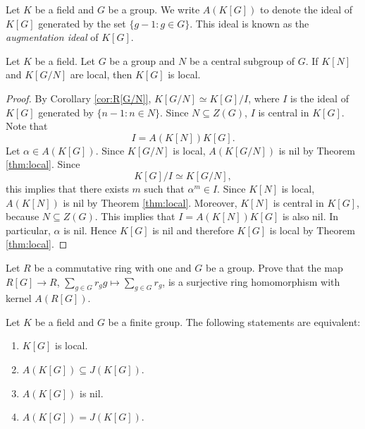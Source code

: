 Let $K$ be a field and $G$ be a group. We write $A(K[G])$ to denote
the ideal of $K[G]$ generated by the set $\{g-1:g\in G\}$. This ideal is known as the
\emph{augmentation ideal} of $K[G]$. 

\begin{corollary}
\label{cor:local_K[N]_and_K[G/N]}
    Let $K$ be a field. 
    Let $G$ be a group and $N$ be a central subgroup of $G$. If $K[N]$ and $K[G/N]$ are local, 
    then $K[G]$ is local. 
\end{corollary}

\begin{proof}
    By Corollary \ref{cor:R[G/N]}, $K[G/N]\simeq K[G]/I$, where 
    $I$ is the ideal of $K[G]$ generated by $\{n-1:n\in N\}$. Since $N\subseteq Z(G)$, 
    $I$ is central in $K[G]$. Note that 
    \[
    I=A(K[N])K[G].
    \]
    Let $\alpha\in A(K[G])$. 
    Since $K[G/N]$ is local, $A(K[G/N])$ is nil by Theorem \ref{thm:local}. Since 
    \[
    K[G]/I\simeq K[G/N],
    \]
    this implies that 
    there exists $m$ such that $\alpha^m\in I$. Since $K[N]$ is local,  
    $A(K[N])$ is nil by Theorem \ref{thm:local}. Moreover, $K[N]$ is central in $K[G]$, because $N\subseteq Z(G)$. This implies that $I=A(K[N])K[G]$ is also nil. In particular, 
    $\alpha$ is nil. Hence 
    $K[G]$ is nil and therefore $K[G]$ is local by Theorem \ref{thm:local}. 
\end{proof}


\begin{exercise}
\label{xca:augmentation}
    Let $R$ be a commutative ring with one and $G$ be a group. 
    Prove that 
    the map $R[G]\to R$, $\sum_{g\in G}r_gg\mapsto\sum_{g\in G}r_g$, is a surjective
    ring homomorphism with kernel $A(R[G])$.  
\end{exercise}

\begin{lemma}
    Let $K$ be a field and $G$ be a finite group. 
    The following statements are equivalent: 
    \begin{enumerate}
        \item $K[G]$ is local. 
        \item $A(K[G])\subseteq J(K[G])$. 
        \item $A(K[G])$ is nil.
        \item $A(K[G])=J(K[G])$. 
    \end{enumerate}
\end{lemma}

